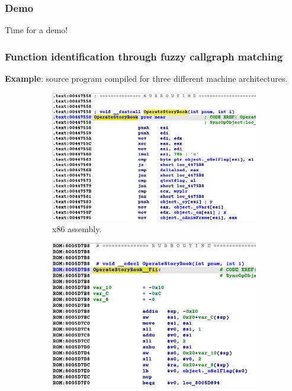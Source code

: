 \begin{frame}
	\frametitle{Demo}

Time for a demo!

\end{frame}

\begin{frame}
	\frametitle{Function identification through fuzzy callgraph matching}


\textbf{Example}: source program compiled for three different machine architectures.

	\begin{figure}[htbp]
		\centering
		\begin{subfigure}[t]{0.32\textwidth}
			\centering
			\includegraphics[width=\linewidth,valign=t]{inc/example/x86_zoom.png}
			\caption{x86 assembly.}
		\end{subfigure}
		\hfill
		\begin{subfigure}[t]{0.32\textwidth}
			\centering
			\includegraphics[width=\linewidth,valign=t]{inc/example/mips_zoom.png}

\end{subfigure}
\end{figure}
\end{frame}
